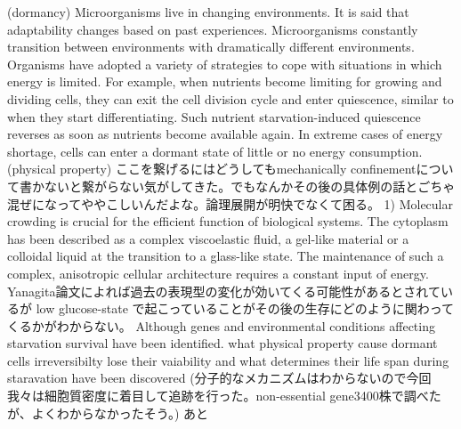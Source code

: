 (dormancy)
Microorganisms live in changing environments. It is said that adaptability changes based on past experiences. 
Microorganisms constantly transition between environments with dramatically different environments. 
Organisms have adopted a variety of strategies to cope with situations in which energy is limited. 
For example, when nutrients become limiting for growing and dividing cells, they can exit the cell division cycle and enter quiescence, similar to when they start differentiating. 
Such nutrient starvation-induced quiescence reverses as soon as nutrients become available again.
In extreme cases of energy shortage, cells can enter a dormant state of little or no energy consumption.
(physical property)
ここを繋げるにはどうしてもmechanically confinementについて書かないと繋がらない気がしてきた。でもなんかその後の具体例の話とごちゃ混ぜになってややこしいんだよな。論理展開が明快でなくて困る。
1) Molecular crowding is crucial for the efficient function of biological systems. \cite{lohka1985induction}\cite{zhou2008macromolecular}\cite{miermont2013severe}\cite{chen2024viscosity}\cite{neurohr2020relevance}
The cytoplasm has been described as a complex viscoelastic fluid, a gel-like material or a colloidal liquid at the transition to a glass-like state.\cite{nishizawa2017universal}
The maintenance of such a complex, anisotropic cellular architecture requires a constant input of energy. \cite{ebata2023activity}
Yanagita論文によれば過去の表現型の変化が効いてくる可能性があるとされているが
low glucose-state で起こっていることがその後の生存にどのように関わってくるかがわからない。 
Although genes and environmental conditions affecting starvation survival have been identified. what physical property cause dormant cells irreversibilty lose their vaiability and what determines their life span during staravation have been discovered
(分子的なメカニズムはわからないので今回我々は細胞質密度に着目して追跡を行った。non-essential gene3400株で調べたが、よくわからなかったそう。)
あと\cite{allen2006isolation}
